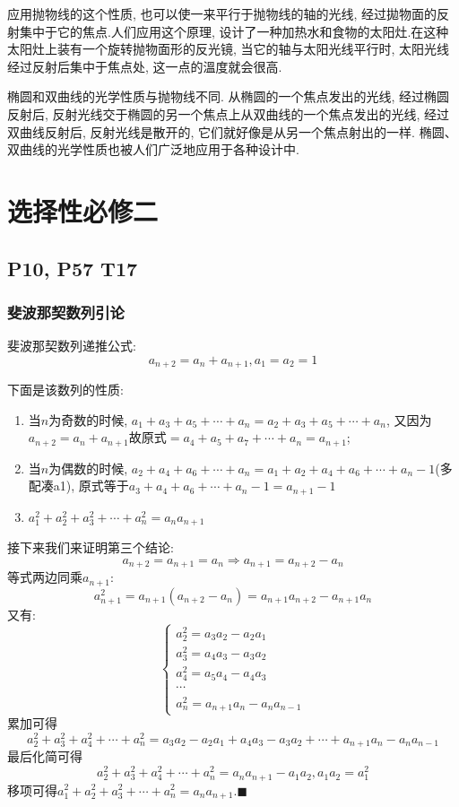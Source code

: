 \documentclass{book}
\begin{document}
    应用抛物线的这个性质, 也可以使一来平行于抛物线的轴的光线, 经过拋物面的反射集中于它的焦点.人们应用这个原理, 设计了一种加热水和食物的太阳灶.在这种太阳灶上装有一个旋转抛物面形的反光镜, 当它的轴与太阳光线平行时, 太阳光线经过反射后集中于焦点处, 这一点的溫度就会很高.

    椭圆和双曲线的光学性质与抛物线不同. 从椭圆的一个焦点发出的光线, 经过椭圆反射后, 反射光线交于椭圆的另一个焦点上从双曲线的一个焦点发出的光线, 经过双曲线反射后, 反射光线是散开的, 它们就好像是从另一个焦点射出的一样. 椭圆、双曲线的光学性质也被人们广泛地应用于各种设计中.

    \chapter{选择性必修二}
    
    \section{\textcolor[rgb]{0.11,0.65,0.52}{P10, P57 T17}}
    \subsection{斐波那契数列引论}
    \textcolor[rgb]{0.38,0.11,0.2}{斐波那契数列}递推公式:$$a_{n+2}=a_n+a_{n+1},a_1=a_2=1$$

    下面是该数列的性质:

    \begin{enumerate}
        \item 当$n$为奇数的时候, $a_1+a_3+a_5+\cdots+a_n=a_2+a_3+a_5+\cdots+a_n$, 又因为$a_{n+2}=a_n+a_{n+1}$故原式$=a_4+a_5+a_7+\cdots+a_n=a_{n+1}$;
        \item 当$n$为偶数的时候, $a_2+a_4+a_6+\cdots+a_n=a_1+a_2+a_4+a_6+\cdots+a_n-1$(多配凑a1), 原式等于$a_3+a_4+a_6+\cdots+a_n-1=a_{n+1}-1$
        \item $\displaystyle a_1^2+a_2^2+a_3^2+\cdots+a_n^2=a_na_{n+1}$
    \end{enumerate}

    接下来我们来证明第三个结论:
    $$a_{n+2}=a_{n+1}=a_n\Longrightarrow a_{n+1}=a_{n+2}-a_n$$
    等式两边同乘$a_{n+1}$:$$a_{n+1}^2=a_{n+1}\left( a_{n+2}-a_n \right)=a_{n+1}a_{n+2}-a_{n+1}a_n$$
    又有:$$\left\{\begin{matrix} 
        a_2^2=a_3a_2-a_2a_1 \\  
        a_3^2=a_4a_3-a_3a_2 \\
        a_4^2=a_5a_4-a_4a_3 \\
        \cdots \\
        a_n^2=a_{n+1}a_n-a_{n}a_{n-1}
      \end{matrix}\right. $$
    累加可得$$a_2^2+a_3^2+a_4^2+\cdots+a_n^2=a_3a_2-a_2a_1+a_4a_3-a_3a_2+\cdots+a_{n+1}a_n-a_{n}a_{n-1}$$
    最后化简可得$$a_2^2+a_3^2+a_4^2+\cdots+a_n^2=a_na_{n+1}-a_1a_2,a_1a_2=a_1^2$$
    移项可得$\displaystyle a_1^2+a_2^2+a_3^2+\cdots+a_n^2=a_na_{n+1}. \blacksquare$
\end{document}
